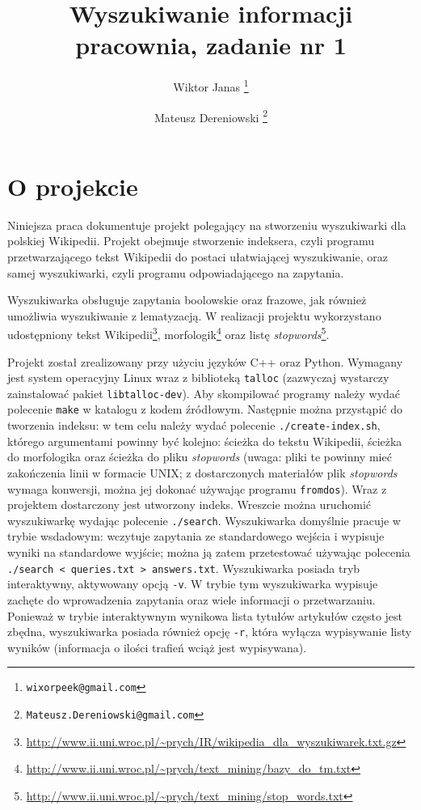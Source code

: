 \documentclass[a4paper,12pt]{article}
\title{\textbf{Wyszukiwanie informacji} \\ pracownia, zadanie nr 1}
\author{
Wiktor Janas \thanks{\texttt{wixorpeek@gmail.com}}
\and
Mateusz Dereniowski \thanks{\texttt{Mateusz.Dereniowski@gmail.com}}}
\begin{document}
\maketitle
\thispagestyle{empty}

\section{O projekcie}
Niniejsza praca dokumentuje projekt polegający na stworzeniu wyszukiwarki dla
polskiej Wikipedii. Projekt obejmuje stworzenie indeksera, czyli programu
przetwarzającego tekst Wikipedii do postaci ułatwiającej wyszukiwanie, oraz
samej wyszukiwarki, czyli programu odpowiadającego na zapytania.

Wyszukiwarka obsługuje zapytania boolowskie oraz frazowe, jak również umożliwia
wyszukiwanie z lematyzacją. W realizacji projektu wykorzystano udostępniony
tekst Wikipedii\footnote{\url{http://www.ii.uni.wroc.pl/~prych/IR/wikipedia_dla_wyszukiwarek.txt.gz}},
morfologik\footnote{\url{http://www.ii.uni.wroc.pl/~prych/text\_mining/bazy_do_tm.txt}}
oraz listę \textit{stopwords}\footnote{\url{http://www.ii.uni.wroc.pl/~prych/text_mining/stop_words.txt}}.

Projekt został zrealizowany przy użyciu języków C++ oraz Python. Wymagany jest
system operacyjny Linux wraz z biblioteką \texttt{talloc} (zazwyczaj wystarczy
zainstalować pakiet \texttt{libtalloc-dev}). Aby skompilować programy należy
wydać polecenie \texttt{make} w katalogu z kodem źródłowym. Następnie można
przystąpić do tworzenia indeksu: w tem celu należy wydać polecenie
\texttt{./create-index.sh}, którego argumentami powinny być kolejno:
ścieżka do tekstu Wikipedii, ścieżka do morfologika oraz ścieżka do pliku
\textit{stopwords} (uwaga: pliki te powinny mieć zakończenia linii w formacie
UNIX; z dostarczonych materiałów plik \textit{stopwords} wymaga konwersji,
można jej dokonać używając programu \texttt{fromdos}). Wraz z projektem
dostarczony jest utworzony indeks. Wreszcie można uruchomić wyszukiwarkę
wydając polecenie \texttt{./search}. Wyszukiwarka domyślnie pracuje w trybie
wsdadowym: wczytuje zapytania ze standardowego wejścia i wypisuje wyniki na
standardowe wyjście; można ją zatem przetestować używając polecenia
\texttt{./search < queries.txt > answers.txt}. Wyszukiwarka posiada tryb
interaktywny, aktywowany opcją \texttt{-v}. W trybie tym wyszukiwarka wypisuje
zachęte do wprowadzenia zapytania oraz wiele informacji o przetwarzaniu.
Ponieważ w trybie interaktywnym wynikowa lista tytułów artykułów często jest
zbędna, wyszukiwarka posiada również opcję \texttt{-r}, która wyłącza
wypisywanie listy wyników (informacja o ilości trafień wciąż jest wypisywana).
\end{document}
